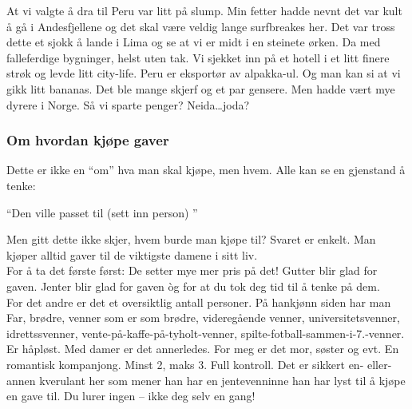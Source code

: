 At vi valgte å dra til Peru var litt på slump. Min fetter hadde nevnt
det var kult å gå i Andesfjellene og det skal være veldig lange
surfbreakes her. Det var tross dette et sjokk å lande i Lima og se at
vi er midt i en steinete ørken. Da med falleferdige bygninger, helst
uten tak. Vi sjekket inn på et hotell i et litt finere strøk og levde
litt city-life. Peru er eksportør av alpakka-ul. Og man kan si at vi
gikk litt bananas. Det ble mange skjerf og et par gensere. Men hadde
vært mye dyrere i Norge. Så vi sparte penger? Neida\ldots joda?
\begin{figure}[H]
	\centering
	\noindent{}
	\caption*{}
	\label{fig:skiltopp}
\end{figure}

\subsubsection{Om hvordan kjøpe gaver}
Dette er ikke en ``om'' hva man skal kjøpe, men hvem. Alle
kan se en gjenstand å tenke:

\begin{dialogue}
	\item ``Den ville passet til (sett inn person) ''
\end{dialogue}

Men gitt dette ikke skjer, hvem burde man kjøpe til? Svaret er
enkelt. Man kjøper alltid gaver til de viktigste damene i sitt liv.\\

For å ta det første først: De setter mye mer pris på det! Gutter blir
glad for gaven. Jenter blir glad for gaven òg for at du tok deg tid
til å tenke på dem.\\

For det andre er det et oversiktlig antall personer. På hankjønn
siden har man Far, brødre, venner som er som brødre, videregående
venner, universitetsvenner, idrettssvenner, 
vente-på-kaffe-på-tyholt-venner, spilte-fotball-sammen-i-7.-venner. Er
håpløst. Med damer er det
annerledes. For meg er det mor, søster og evt. En romantisk
kompanjong. Minst 2, maks 3. Full kontroll. Det er sikkert en-
eller-annen kverulant her som mener han har en jentevenninne han har lyst
til å kjøpe en gave til. Du lurer ingen -- ikke deg selv en gang!\\

